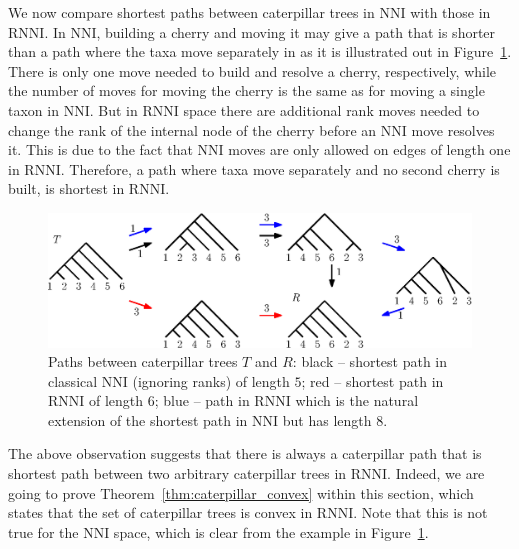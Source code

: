 \documentclass{amsart}
\newcommand{\nni}{\mathrm{NNI}}
\newcommand{\rnni}{\mathrm{RNNI}}
\begin{document}
We now compare shortest paths between caterpillar trees in $\nni$ with those in $\rnni$.
In $\nni$, building a cherry and moving it may give a path that is shorter than a path where the taxa move separately in as it is illustrated out in Figure~\ref{fig:NNI_vs_RNNI}.
There is only one move needed to build and resolve a cherry, respectively, while the number of moves for moving the cherry is the same as for moving a single taxon in $\nni$.
But in $\rnni$ space there are additional rank moves needed to change the rank of the internal node of the cherry before an $\nni$ move resolves it.
This is due to the fact that $\nni$ moves are only allowed on edges of length one in $\rnni$.
Therefore, a path where taxa move separately and no second cherry is built, is shortest in $\rnni$.

\begin{figure}[H]
	\centering
	\includegraphics[width=\textwidth]{NNI_vs_RNNI}
	\caption{Paths between caterpillar trees $T$ and $R$: black -- shortest path in classical $\nni$ (ignoring ranks) of length $5$; red -- shortest path in $\rnni$ of length $6$; blue -- path in $\rnni$ which is the natural extension of the shortest path in $\nni$ but has length $8$.}
	\label{fig:NNI_vs_RNNI}
\end{figure}

The above observation suggests that there is always a caterpillar path that is shortest path between two arbitrary caterpillar trees in $\rnni$.
Indeed, we are going to prove Theorem~\ref{thm:caterpillar_convex} within this section, which states that the set of caterpillar trees is convex in $\rnni$.
Note that this is not true for the $\nni$ space, which is clear from the example in Figure~\ref{fig:NNI_vs_RNNI}.
\end{document}
